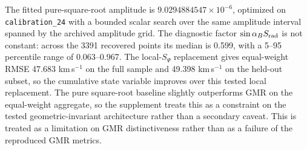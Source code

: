 \documentclass[twocolumn,linenumbers]{aastex701}
\begin{document}
The fitted pure-square-root amplitude is $9.0294884547\times10^{-6}$, optimized on \texttt{calibration\_24} with a bounded scalar search over the same amplitude interval spanned by the archived amplitude grid. The diagnostic factor $\sin\alpha_B S_{\rm rad}$ is not constant: across the 3391 recovered points its median is 0.599, with a 5--95 percentile range of 0.063--0.967. The local-$S_\Psi$ replacement gives equal-weight RMSE 47.683 km\,s$^{-1}$ on the full sample and 49.398 km\,s$^{-1}$ on the held-out subset, so the cumulative state variable improves over this tested local replacement. The pure square-root baseline slightly outperforms GMR on the equal-weight aggregate, so the supplement treats this as a constraint on the tested geometric-invariant architecture rather than a secondary caveat. This is treated as a limitation on GMR distinctiveness rather than as a failure of the reproduced GMR metrics.
\end{document}
